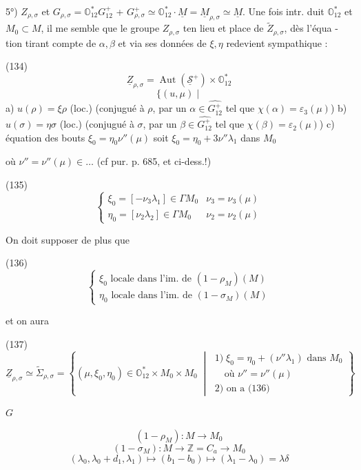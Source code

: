 \newpage


5°) $Z_{\rho,\sigma}$ et $G_{\rho,\sigma} = \mathbb{O}_{12}^* G_{12}^+$ + $G_{\rho,\sigma}^+ \simeq \mathbb{O}_{12}^* \cdot \underline{M} = \underline{M}_{\rho,\sigma} \simeq \underline{M}$.
Une fois intr. duit $\mathbb{O}_{12}^*$ et $M_0 \subset M$, il me semble que le groupe $Z_{\rho,\sigma}$ ten lieu et place de $\tilde{Z}_{\rho,\sigma}$, dès l'équa - tion tirant compte de $\alpha, \beta$ et via ses données de $\xi, \eta$ redevient sympathique :

(134)
$$ \underline{Z}_{\rho,\sigma} = \operatorname{Aut}(\underline{\mathcal{S}}^+) \times \mathbb{O}_{12}^* $$
$$ \{ (u, \mu) \mid $$
a) $u(\rho) = \xi \rho$ (loc.) (conjugué à $\rho$, par un $\alpha \in \widehat{G_{12}^+}$ tel que $\chi(\alpha) = \varepsilon_3(\mu)$)
b) $u(\sigma) = \eta \sigma$ (loc.) (conjugué à $\sigma$, par un $\beta \in \widehat{G_{12}^+}$ tel que $\chi(\beta) = \varepsilon_2(\mu)$)
c) équation des bouts $\xi_0 = \eta_0 \nu''(\mu)$ soit $\xi_0 = \eta_0 + 3 \nu'' \lambda_1$ dans $M_0$

où $\nu'' = \nu''(\mu) \in \dots$ (cf pur. p. 685, et ci-dess.!)

(135)
$$ \begin{cases} \xi_0 = [- \nu_3 \lambda_1] \in \Gamma M_0 & \nu_3 = \nu_3(\mu) \\ \eta_0 = [\nu_2 \lambda_2] \in \Gamma M_0 & \nu_2 = \nu_2(\mu) \end{cases} $$

On doit supposer de plus que

(136)
$$ \begin{cases} \xi_0 \text{ locale dans l'im. de } (1 - \rho_M)(M) \\ \eta_0 \text{ locale dans l'im. de } (1 - \sigma_M)(M) \end{cases} $$

et on aura

(137)
$$ \underline{Z}_{\rho,\sigma} \simeq \tilde{\Sigma}_{\rho,\sigma} = \left\{ (\mu, \xi_0, \eta_0) \in \mathbb{O}_{12}^* \times M_0 \times M_0 \;\middle|\; \begin{matrix} 1) \; \xi_0 = \eta_0 + (\nu'' \lambda_1) \text{ dans } M_0 \\ \quad \text{où } \nu'' = \nu''(\mu) \\ 2) \text{ on a (136)} \end{matrix} \right\} $$

$G$

$$ (1 - \rho_M) : M \to M_0 $$
$$ (1 - \sigma_M) : M \to \mathbb{Z} = C_a \to M_0 $$
$$ (\lambda_0, \lambda_0+d_1, \lambda_1) \mapsto (b_1 - b_0) \mapsto (\lambda_1 - \lambda_0) = \lambda \delta $$

